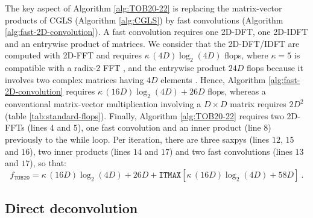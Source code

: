 The key aspect of Algorithm \ref{alg:TOB20-22} is replacing the matrix-vector products of CGLS (Algorithm \ref{alg:CGLS})
by fast convolutions (Algorithm \ref{alg:fast-2D-convolution}).
A fast convolution requires one 2D-DFT, one 2D-IDFT and an entrywise product of matrices.
We consider that the 2D-DFT/IDFT are computed with 2D-FFT and requires $\kappa \, (4D)\log_{2}(4D)$ flops, where $\kappa = 5$ is compatible with a radix-2 FFT 
\citep[][p. 16]{vanloan1992}, and the entrywise product $24D$ flops because it involves two complex matrices having $4D$ elements
\citep[][p. 36]{golub-vanloan2013}.
Hence, Algorithm \ref{alg:fast-2D-convolution} requires $\kappa \, (16D)\log_{2}(4D) + 26D$ flops,
whereas a conventional matrix-vector multiplication involving a $D \times D$ matrix requires $2D^{2}$ (table \ref{tab:standard-flops}).
Finally, Algorithm \ref{alg:TOB20-22} requires two 2D-FFTs (lines $4$ and $5$), one fast convolution and an inner product (line $8$)
previously to the while loop.
Per iteration, there are three saxpys (lines $12$, $15$ and $16$), two inner products (lines $14$ and $17$) and 
two fast convolutions (lines $13$ and $17$), so that:
\begin{equation}
	f_{\mathtt{TOB20}} = \kappa \, (16D)\log_{2}(4D) + 26D + \mathtt{ITMAX} 
	\left[
	\kappa \, (16D)\log_{2}(4D) + 58D
	\right] \: .
	\label{flops:TOB20}
\end{equation}

\subsection{Direct deconvolution}

